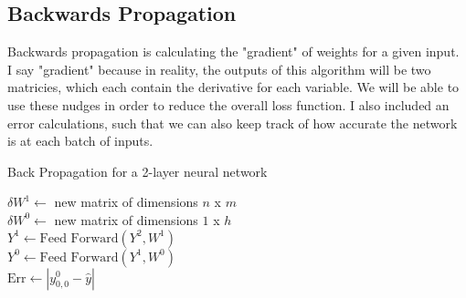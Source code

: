 \documentclass[10pt]{article}
\begin{document}
\subsection{Backwards Propagation}
Backwards propagation is calculating the "gradient" of weights for a given input. I say "gradient" because in reality, the outputs of this algorithm will be two matricies, which each contain the derivative for each variable. We will be able to use these nudges in order to reduce the overall loss function. I also included an error calculations, such that we can also keep track of how accurate the network is at each batch of inputs.\newline
\begin{algorithm}[H]
    \caption{Back Propagation for a 2-layer neural network}
    $\delta W^1 \gets$ new matrix of dimensions $n$ x $m$\\
    $\delta W^0 \gets$ new matrix of dimensions $1$ x $h$\\
    $Y^1 \gets \text{Feed Forward}(Y^2,W^1)$\\
    $Y^0 \gets \text{Feed Forward}(Y^1,W^0)$\\
    $\text{Err} \gets | y^0_{0,0} - \hat{y}  |$\\
\end{algorithm}
\end{document}
